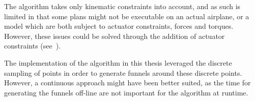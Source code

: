 The algorithm takes only kinematic constraints into account, and as such is
limited in that some plans might not be executable on an actual airplane, or a
model which are both subject to actuator constraints, forces and torques.
However, these issues could be solved through the addition of actuator
constraints (see~\cite[sec.4.3.3]{majumdarFunnelLibrariesRealtime2017}).

The implementation of the algorithm in this thesis leveraged the discrete
sampling of points in order to generate funnels around these discrete points.
However, a continuous approach might have been better suited, as the time for
generating the funnels off-line are not important for the algorithm at runtime.

